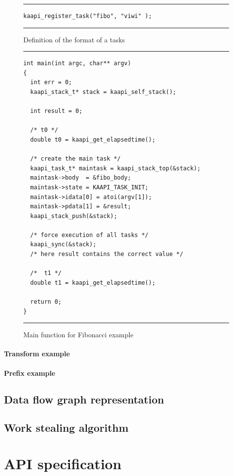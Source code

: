 \documentclass{report}
\begin{document}
\begin{figure}
\hrule
\begin{verbatim}
kaapi_register_task("fibo", "viwi" ); 
\end{verbatim}
\hrule
\caption{Definition of the format of a tasks}
\label{fig:fibo}
\end{figure}

\begin{figure}[!h]
\hrule
\begin{verbatim}
int main(int argc, char** argv)
{
  int err = 0;
  kaapi_stack_t* stack = kaapi_self_stack();

  int result = 0;
  
  /* t0 */
  double t0 = kaapi_get_elapsedtime();
  
  /* create the main task */
  kaapi_task_t* maintask = kaapi_stack_top(&stack);
  maintask->body  = &fibo_body;
  maintask->state = KAAPI_TASK_INIT;
  maintask->idata[0] = atoi(argv[1]);
  maintask->pdata[1] = &result;
  kaapi_stack_push(&stack);
  
  /* force execution of all tasks */
  kaapi_sync(&stack);
  /* here result contains the correct value */

  /*  t1 */
  double t1 = kaapi_get_elapsedtime();

  return 0;
}
\end{verbatim}
\hrule
\caption{Main function for Fibonacci example}
\label{fig:fibomain}
\end{figure}


\subsubsection{Transform example}

\subsubsection{Prefix example}

\section{Data flow graph representation}

\section{Work stealing algorithm}

\newpage
\chapter{API specification}
\end{document}
